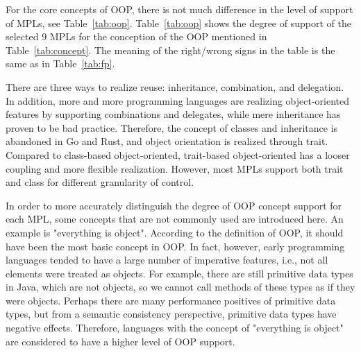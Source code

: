 
For the core concepts of OOP, there is not much difference in the level of support of MPLs, see Table~\ref{tab:oop}.
Table~\ref{tab:oop} shows the degree of support of the selected 9 MPLs for the conception of the OOP
mentioned in Table~\ref{tab:concept}.
The meaning of the right/wrong signs in the table is the same as in Table~\ref{tab:fp}.

There are three ways to realize reuse: inheritance, combination, and delegation.
In addition, more and more programming languages are realizing object-oriented
features by supporting combinations and delegates, while mere
inheritance has proven to be bad practice\cite{gamma1995design}.
Therefore, the concept of classes and inheritance is abandoned in Go and Rust, and object orientation is realized through trait. Compared to class-based object-oriented, trait-based object-oriented has a looser coupling and more flexible realization. However, most MPLs support both trait and class for different granularity of control.

In order to more accurately distinguish the degree of OOP concept support for each MPL, some concepts that are not commonly used are introduced here. An example is "everything is object". According to the definition of OOP, it should have been the most basic concept in OOP. In fact, however, early programming languages tended to have a large number of imperative features, i.e., not all elements were treated as objects. For example, there are still primitive data types in Java, which are not objects, so we cannot call methods of these types as if they were objects. Perhaps there are many performance positives of primitive data types, but from a semantic consistency perspective, primitive data types have negative effects. Therefore, languages with the concept of "everything is object" are considered to have a higher level of OOP support.

